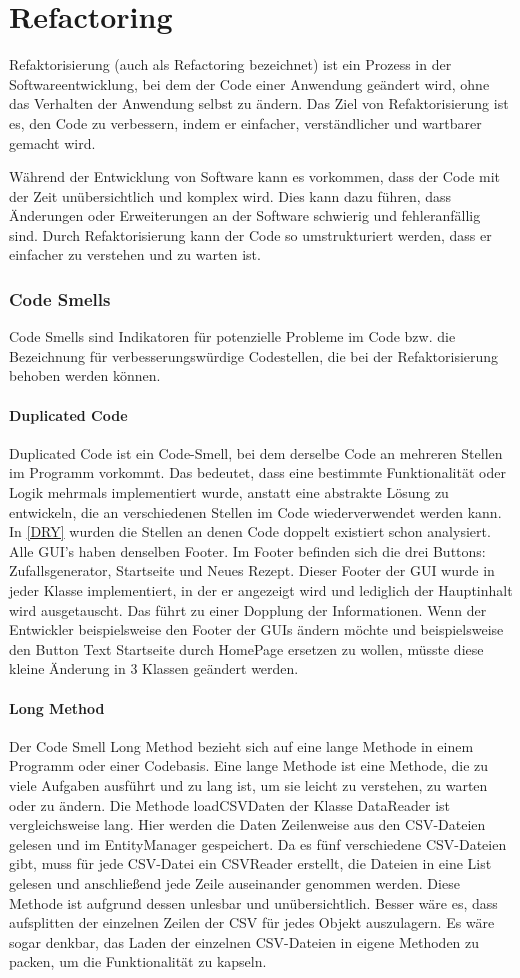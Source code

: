 \chapter{Refactoring}
Refaktorisierung (auch als Refactoring bezeichnet) ist ein Prozess in der Softwareentwicklung, bei dem der Code einer Anwendung geändert wird, ohne das Verhalten der Anwendung selbst zu ändern. Das Ziel von Refaktorisierung ist es, den Code zu verbessern, indem er einfacher, verständlicher und wartbarer gemacht wird.

Während der Entwicklung von Software kann es vorkommen, dass der Code mit der Zeit unübersichtlich und komplex wird. Dies kann dazu führen, dass Änderungen oder Erweiterungen an der Software schwierig und fehleranfällig sind. Durch Refaktorisierung kann der Code so umstrukturiert werden, dass er einfacher zu verstehen und zu warten ist.
\subsection{Code Smells}
Code Smells sind Indikatoren für potenzielle Probleme im Code bzw. die Bezeichnung für verbesserungswürdige Codestellen, die bei der Refaktorisierung behoben werden können. 
\subsubsection{Duplicated Code}
Duplicated Code ist ein Code-Smell, bei dem derselbe Code an mehreren Stellen im Programm vorkommt. Das bedeutet, dass eine bestimmte Funktionalität oder Logik mehrmals implementiert wurde, anstatt eine abstrakte Lösung zu entwickeln, die an verschiedenen Stellen im Code wiederverwendet werden kann. In \autoref{DRY} wurden die Stellen an denen Code doppelt existiert schon analysiert. Alle GUI's haben denselben Footer. Im Footer befinden sich die drei Buttons: Zufallsgenerator, Startseite und Neues Rezept. Dieser Footer der GUI wurde in jeder Klasse implementiert, in der er angezeigt wird und lediglich der Hauptinhalt wird ausgetauscht. Das führt zu einer Dopplung der Informationen. Wenn der Entwickler beispielsweise den Footer der GUIs ändern möchte und beispielsweise den Button Text Startseite durch HomePage ersetzen zu wollen, müsste diese kleine Änderung in 3 Klassen geändert werden. 
\subsubsection{Long Method}
Der Code Smell Long Method bezieht sich auf eine lange Methode in einem Programm oder einer Codebasis. Eine lange Methode ist eine Methode, die zu viele Aufgaben ausführt und zu lang ist, um sie leicht zu verstehen, zu warten oder zu ändern. 
Die Methode loadCSVDaten der Klasse DataReader ist vergleichsweise lang. Hier werden die Daten Zeilenweise aus den CSV-Dateien gelesen und im EntityManager gespeichert.
Da es fünf verschiedene CSV-Dateien gibt, muss für jede CSV-Datei ein CSVReader erstellt, die Dateien in eine List gelesen und anschließend jede Zeile auseinander genommen werden. Diese Methode ist aufgrund dessen unlesbar und unübersichtlich. Besser wäre es, dass aufsplitten der einzelnen Zeilen der CSV für jedes Objekt auszulagern. Es wäre sogar denkbar, das Laden der einzelnen CSV-Dateien in eigene Methoden zu packen, um die Funktionalität zu kapseln.
